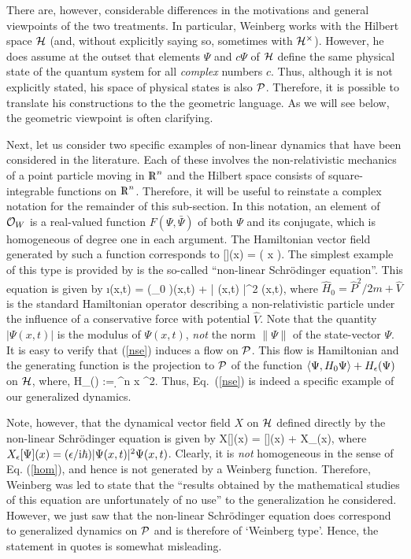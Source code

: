 There are, however, considerable differences in the motivations and
general viewpoints of the two treatments. In particular, Weinberg
works with the Hilbert space $\H$ (and, without explicitly saying so,
sometimes with $\punctH$). However, he does assume at the outset that
elements $\Psi$ and $c\Psi$ of $\H$ define the same physical state of
the quantum system for all {\it complex} numbers $c$. Thus, although
it is not explicitly stated, his space of physical states is also
$\P$.  Therefore, it is possible to translate his constructions to the
the geometric language. As we will see below, the geometric viewpoint
is often clarifying.

Next, let us consider two specific examples of non-linear dynamics
that have been considered in the literature.  Each of these involves
the non-relativistic mechanics of a point particle moving in $\R^n$
and the Hilbert space consists of square-integrable functions on
$\R^n$. Therefore, it will be useful to reinstate a complex notation
for the remainder of this sub-section.  In this notation, an element
of ${\cal O}_W$ is a real-valued function $F(\Psi, \bar{\Psi})$ of
both $\Psi$ and its conjugate, which is homogeneous of degree one in
each argument. The Hamiltonian vector field generated by such a
function corresponds to
%
\be 
{}[\Psi](x) =   ( x ).  
\ee
%
The simplest example of this type is provided by is the so-called
``non-linear Schr\"odinger equation''.  This equation is given by
%
\be \label{nse}
\i\hbar {}(x,t) = 
(_0 \Psi)(x,t) + \epsilon | \Psi(x,t) |^2 \Psi(x,t),
\ee
%
where $\hat{H}_0 = \hat{P}^2/2m + \hat{V}$ is the standard Hamiltonian
operator describing a non-relativistic particle under the influence of
a conservative force with potential $\hat{V}$.  Note that the quantity
$| \Psi(x,t) | $ is the modulus of $\Psi(x,t)$, {\em not} the norm
$\|\Psi\|$ of the state-vector $\Psi$. It is easy to verify that
(\ref{nse}) induces a flow on $\P$. This flow is Hamiltonian and the
generating function is the projection to $\P$ of the function
$\<\Psi, H_0\Psi\> + H_\epsilon(\Psi)$ on $\H$, where,
%
\be
 H_\epsilon(\Psi) := \int \d^n \! x
^2.
\ee
%
Thus, Eq.~(\ref{nse}) is indeed a specific example of our generalized
dynamics.

Note, however, that the dynamical vector field $X$ on $\H$ defined
directly by the non-linear Schr\"odinger equation is given by
%
\be X[\Psi](x) = [\Psi](x) + X_\epsilon[\Psi](x), 
\ee 
%
where $X_\epsilon[\Psi](x) = (\epsilon/\i\hbar) |\Psi(x,t)|^2
\Psi(x,t)$. Clearly, it is {\it not} homogeneous in the sense of
Eq. (\ref{hom}), and hence is not generated by a Weinberg function.
Therefore, Weinberg was led to state that the ``results obtained by
the mathematical studies of this equation are unfortunately of no
use'' to the generalization he considered. However, we just saw that
the non-linear Schr\"odinger equation does correspond to generalized
dynamics on $\P$ and is therefore of `Weinberg type'. Hence, the
statement in quotes is somewhat misleading.


